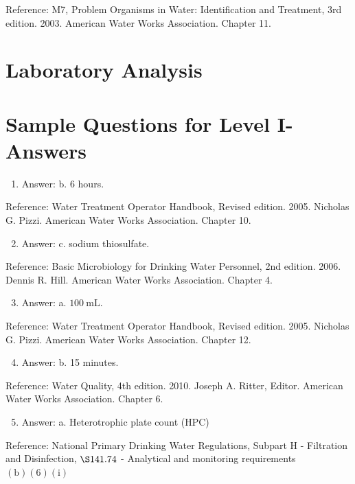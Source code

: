 \documentclass[10pt]{article}
\begin{document}
Reference: M7, Problem Organisms in Water: Identification and Treatment, 3rd edition. 2003. American Water Works Association. Chapter 11.

\section{Laboratory Analysis}
\section{Sample Questions for Level I-Answers}
\begin{enumerate}
  \item Answer: b. 6 hours.
\end{enumerate}

Reference: Water Treatment Operator Handbook, Revised edition. 2005. Nicholas G. Pizzi. American Water Works Association. Chapter 10.

\begin{enumerate}
  \setcounter{enumi}{1}
  \item Answer: c. sodium thiosulfate.
\end{enumerate}

Reference: Basic Microbiology for Drinking Water Personnel, 2nd edition. 2006. Dennis R. Hill. American Water Works Association. Chapter 4.

\begin{enumerate}
  \setcounter{enumi}{2}
  \item Answer: a. $100 \mathrm{~mL}$.
\end{enumerate}

Reference: Water Treatment Operator Handbook, Revised edition. 2005. Nicholas G. Pizzi. American Water Works Association. Chapter 12.

\begin{enumerate}
  \setcounter{enumi}{3}
  \item Answer: b. 15 minutes.
\end{enumerate}

Reference: Water Quality, 4th edition. 2010. Joseph A. Ritter, Editor. American Water Works Association. Chapter 6.

\begin{enumerate}
  \setcounter{enumi}{4}
  \item Answer: a. Heterotrophic plate count (HPC)
\end{enumerate}

Reference: National Primary Drinking Water Regulations, Subpart H - Filtration and Disinfection, $\S 141.74$ - Analytical and monitoring requirements $(\mathrm{b})(6)(\mathrm{i})$
\end{document}
